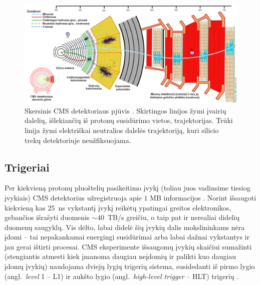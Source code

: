 \documentclass[a4paper, 12pt, oneside]{article}
\begin{document}
\begin{figure}[t]
	\includegraphics[width=\textwidth]{CMSslice_LT.png}
	\caption{\label{fig:CMSslice}Skersinis CMS detektoriaus pjūvis \cite{CMSslice}.
	Skirtingos linijos žymi įvairių dalelių, išlekiančių iš protonų susidūrimo vietos, trajektorijas.
	Trūki linija žymi elektriškai neutralios dalelės trajektoriją, kuri silicio trekų detektoriuje
	neužfiksuojama.}
\end{figure}

\subsection{Trigeriai}
Per kiekvieną protonų pluoštelių pasikeitimo įvykį (toliau juos vadinsime tiesiog įvykiais) CMS detektorius
užregistruoja apie $1$ MB informacijos \cite{CMScomputing}.
Norint išsaugoti kiekvieną kas $25$~ns vykstantį įvykį reikėtų ypatingai greitos elektronikos, gebančios išrašyti
duomenis $\sim\!\!40$~TB/s greičiu, o taip pat ir nerealiai didelių duomenų saugyklų.
Vis dėlto, labai didelė šių įvykių dalis mokslininkams nėra įdomi -- tai nepakankamai energingi susidūrimai
arba labai dažnai vykstantys ir jau gerai ištirti procesai.
CMS eksperimente išsaugomų įvykių skaičiui sumažinti (stengiantis atmesti kiek įmanoma daugiau neįdomių ir palikti
kuo daugiau įdomų įvykių) naudojama dviejų lygių trigerių sistema, susidedanti iš pirmo lygio
(angl.\ \textit{level} 1 -- L1) ir aukšto lygio (angl.\ \textit{high-level trigger} -- HLT) trigerių \cite{CMStrig}.
\end{document}
